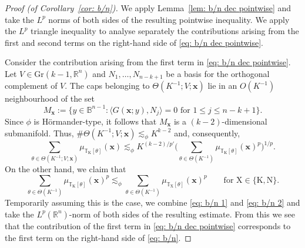 \documentclass[reqno]{amsart}
\numberwithin{equation}{section}
\newcommand{\B}{\mathbb{B}}
\newcommand{\R}{\mathbb{R}}
\newcommand{\T}{\mathbb{T}}
\newcommand{\bx}{\mathbf{x}}
\def\inn#1#2{\langle#1,#2\rangle}
\theoremstyle{plain}
\theoremstyle{definition}
\begin{document}
\begin{proof}[Proof (of Corollary~\ref{cor: b/n})] We apply Lemma~\ref{lem: b/n dec pointwise} and take the $L^p$ norms of both sides of the resulting pointwise inequality. We apply the $L^p$ triangle inequality to analyse separately the contributions arising from the first and second terms on the right-hand side of \eqref{eq: b/n dec pointwise}.

Consider the contribution arising from the first term in \eqref{eq: b/n dec pointwise}. Let $V \in \mathrm{Gr}(k-1,\R^n)$ and $N_1, \dots, N_{n-k+1}$ be a basis for the orthogonal complement of $V$. The caps belonging to $\Theta(K^{-1}; V; \bx)$ lie in an $O(K^{-1})$ neighbourhood of the set
\begin{equation*}
 M_{\bx} := \big\{ y \in \B^{n-1} : \inn{G(\bx;y)}{N_j} = 0 \textrm{ for } 1 \leq j \leq n-k+1\big\}. 
\end{equation*}
Since $\phi$ is H\"ormander-type, it follows that $M_{\bx}$ is a $(k-2)$-dimensional submanifold. Thus, $\# \Theta(K^{-1}; V; \bx) \lesssim_\phi K^{k-2}$ and, consequently, 
\begin{equation}\label{eq: b/n 1}
    \sum_{\theta \in \Theta(K^{-1}; V; \bx)}\mu_{\T_{\mathrm{K}}[\theta]}(\bx) \lesssim_\phi K^{(k-2)/p'}  \Big(\sum_{\theta \in \Theta(K^{-1})}\mu_{\T_{\mathrm{K}}[\theta]}(\bx)^p \Big)^{1/p}.
\end{equation}
On the other hand, we claim that
\begin{equation}\label{eq: b/n 2}
    \sum_{\theta \in \Theta(K^{-1})}\mu_{\T_{\mathrm{K}}[\theta]}(\bx)^p \lesssim_\phi\sum_{\theta \in \Theta(K^{-1})}\mu_{\T_{\mathrm{X}}[\theta]}(\bx)^p \qquad \textrm{for $\mathrm{X} \in \{\mathrm{K},\mathrm{N}\}.$}
\end{equation}
Temporarily assuming this is the case, we combine \eqref{eq: b/n 1} and \eqref{eq: b/n 2} and take the $L^p(\R^n)$-norm of both sides of the resulting estimate. From this we see that the contribution of the first term in \eqref{eq: b/n dec pointwise} corresponds to the first term on the right-hand side of \eqref{eq: b/n}.


\end{proof}
\end{document}
